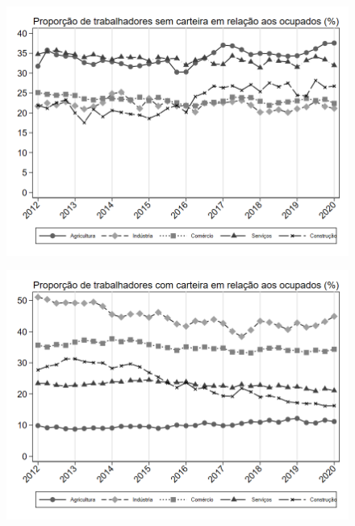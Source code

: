 \begin{frame}[label=_composicao_demografica_setor_prop_empregadoSC]{}
\textit{\hyperlink{_composicao_demografica_setor}{}}
\begin{figure}
  \centering
  \includegraphics[width=1.0\linewidth]{../../analysis/output/composicao_demografica/setor/_composicao_demografica_setor_prop_empregadoSC.png}
  \caption{}
  \label{fig:_composicao_demografica_setor_prop_empregadoSC}
\end{figure}
\end{frame}

\begin{frame}[label=_composicao_demografica_setor_prop_empregadoCC]{}
\textit{\hyperlink{_composicao_demografica_setor}{}}
\begin{figure}
  \centering
  \includegraphics[width=1.0\linewidth]{../../analysis/output/composicao_demografica/setor/_composicao_demografica_setor_prop_empregadoCC.png}
  \caption{}
  \label{fig:_composicao_demografica_setor_prop_empregadoCC}
\end{figure}
\end{frame}


